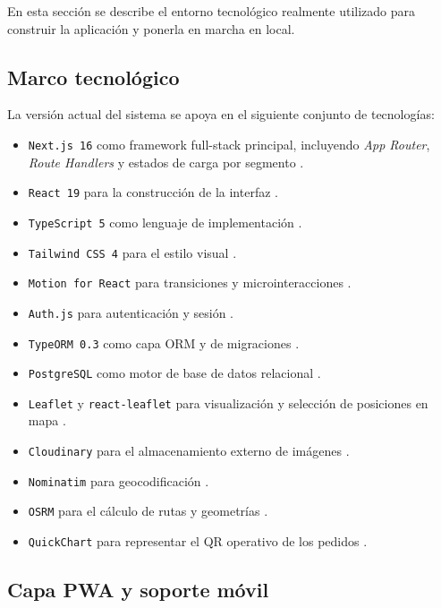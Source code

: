 En esta sección se describe el entorno tecnológico realmente utilizado para construir la aplicación y ponerla en marcha en local.

\subsection{Marco tecnológico}

La versión actual del sistema se apoya en el siguiente conjunto de tecnologías:

\begin{itemize}
    \item \texttt{Next.js 16} como framework full-stack principal, incluyendo \textit{App Router}, \textit{Route Handlers} y estados de carga por segmento \citep{nextjsdocs2026,nextjsroutehandlers2026,nextjsloading2026}.
    \item \texttt{React 19} para la construcción de la interfaz \citep{reactdocs2026}.
    \item \texttt{TypeScript 5} como lenguaje de implementación \citep{typescriptdocs2026}.
    \item \texttt{Tailwind CSS 4} para el estilo visual \citep{tailwinddocs2026}.
    \item \texttt{Motion for React} para transiciones y microinteracciones \citep{motionreactdocs2026}.
    \item \texttt{Auth.js} para autenticación y sesión \citep{authjsdocs2026}.
    \item \texttt{TypeORM 0.3} como capa ORM y de migraciones \citep{typeormentities2026,typeormmigrations2026}.
    \item \texttt{PostgreSQL} como motor de base de datos relacional \citep{postgresdocs2026}.
    \item \texttt{Leaflet} y \texttt{react-leaflet} para visualización y selección de posiciones en mapa \citep{leafletdocs2026}.
    \item \texttt{Cloudinary} para el almacenamiento externo de imágenes \citep{cloudinaryupload2026}.
    \item \texttt{Nominatim} para geocodificación \citep{nominatimapi2026}.
    \item \texttt{OSRM} para el cálculo de rutas y geometrías \citep{osrmdocs2026}.
    \item \texttt{QuickChart} para representar el QR operativo de los pedidos \citep{quickchartqr2026}.
\end{itemize}

\subsection{Capa PWA y soporte móvil}

